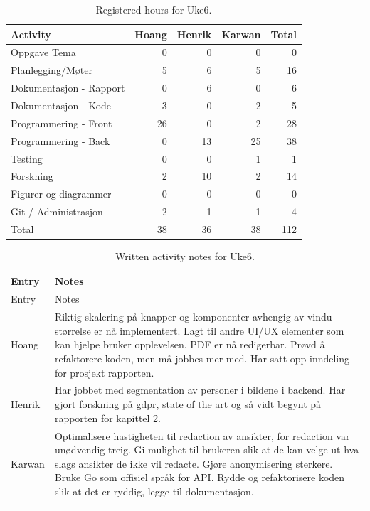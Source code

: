 \begin{table}[H]
\centering
\small
\caption{Registered hours for Uke6.}
\label{tab:project-hours-uke6}
\begin{tabular}{lrrrr}
\toprule
Activity & Hoang & Henrik & Karwan & Total \\
\midrule
Oppgave Tema & 0 & 0 & 0 & 0 \\
Planlegging/Møter & 5 & 6 & 5 & 16 \\
Dokumentasjon - Rapport & 0 & 6 & 0 & 6 \\
Dokumentasjon - Kode & 3 & 0 & 2 & 5 \\
Programmering - Front & 26 & 0 & 2 & 28 \\
Programmering - Back & 0 & 13 & 25 & 38 \\
Testing & 0 & 0 & 1 & 1 \\
Forskning & 2 & 10 & 2 & 14 \\
Figurer og diagrammer & 0 & 0 & 0 & 0 \\
Git / Administrasjon & 2 & 1 & 1 & 4 \\
\midrule
Total & 38 & 36 & 38 & 112 \\
\bottomrule
\end{tabular}
\end{table}

\begin{longtable}{p{}p{}}
\caption{Written activity notes for Uke6.}\\
\toprule
Entry & Notes \\
\midrule
\endfirsthead
\toprule
Entry & Notes \\
\midrule
\endhead
Hoang & Riktig skalering på knapper og komponenter avhengig av vindu størrelse er nå implementert. Lagt til andre UI/UX elementer som kan hjelpe bruker opplevelsen. PDF er nå redigerbar. Prøvd å refaktorere koden, men må jobbes mer med. Har satt opp inndeling for prosjekt rapporten. \\
\addlinespace
Henrik & Har jobbet med segmentation av personer i bildene i backend. Har gjort forskning på gdpr, state of the art og så vidt begynt på rapporten for kapittel 2. \\
\addlinespace
Karwan & Optimalisere hastigheten til redaction av ansikter, for redaction var unødvendig treig. Gi mulighet til brukeren slik at de kan velge ut hva slags ansikter de ikke vil redacte. Gjøre anonymisering sterkere. Bruke Go som offisiel språk for API. Rydde og refaktorisere koden slik at det er ryddig, legge til dokumentasjon. \\
\addlinespace
\bottomrule
\end{longtable}

